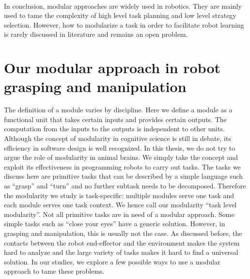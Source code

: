 ~\\
In conclusion, modular approaches are widely used in robotics. They are mainly used to tame the complexity of high level task planning and low level strategy selection. However, how to modularize a task in order to facilitate robot learning is rarely discussed in literature and remains an open problem.






\section{Our modular approach in robot grasping and manipulation}
\label{cha1:contribution}
The definition of a module varies by discipline. Here we define a module as a functional unit that takes certain inputs and provides certain outputs. The computation from the inputs to the outputs is independent to other units. Although the concept of modularity in cognitive science is still in debate, its efficiency in software design is well recognized. In this thesis, we do not try to argue the role of modularity in animal brains. We simply take the concept and exploit its effectiveness in programming robots to carry out tasks. The tasks we discuss here are primitive tasks that can be described by a simple language such as ``grasp'' and ``turn'' and no further subtask needs to be decomposed. Therefore the modularity we study is task-specific: multiple modules serve one task and each module serves one task context. We hence call our modularity ``task level modularity''. Not all primitive tasks are in need of a modular approach. Some simple tasks such as ``close your eyes'' have a generic solution. However, in grasping and manipulation, this is usually not the case. As discussed before, the contacts between the robot end-effector and the environment makes the system hard to analyze and the large variety of tasks makes it hard to find a universal solution. In our studies, we explore a few possible ways to use a modular approach to tame these problems.


